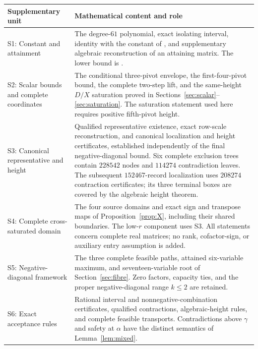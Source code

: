 \documentclass[11pt,reqno]{amsart}
\theoremstyle{definition}
\theoremstyle{remark}
\newcommand{\gam}{\gamma}
\begin{document}
\begingroup
\small
\renewcommand{\arraystretch}{1.08}
\begin{longtable}{@{}>{\raggedright\arraybackslash}p{.21\linewidth}
                        >{\raggedright\arraybackslash}p{.75\linewidth}@{}}
\toprule
Supplementary unit&Mathematical content and role\\
\midrule
\endhead
S1: Constant and attainment&
The degree-\(61\) polynomial, exact isolating interval, identity with
the constant of \cite{ChenEdelmanUrschel2026}, and supplementary
algebraic reconstruction of an attaining matrix. The lower bound is
\cite[Theorem~2.2]{ChenEdelmanUrschel2026}.\\[1mm]

S2: Scalar bounds and complete coordinates&
The conditional three-pivot envelope, the first-four-pivot bound,
the complete two-step lift, and the same-height \(D/X\) saturation
proved in Sections~\ref{sec:scalar}--\ref{sec:saturation}.
The saturation statement used here requires positive fifth-pivot height.\\[1mm]

S3: Canonical representative and height&
Qualified representative existence, exact row-scale reconstruction,
and canonical localization and height certificates, established
independently of the final negative-diagonal bound.
Six complete exclusion trees contain \(228542\) nodes and \(114274\)
contradiction leaves. The subsequent \(152467\)-record localization
uses \(208274\) contraction certificates; its three terminal
boxes are covered by the algebraic height theorem.\\[1mm]

S4: Complete cross-saturated domain&
The four source domains and exact sign and transpose maps of
Proposition~\ref{prop:X}, including their shared boundaries.
The low-\(r\) component uses S3.
All statements concern complete real matrices; no rank, cofactor-sign,
or auxiliary entry assumption is added.\\[1mm]

S5: Negative-diagonal framework&
The three complete feasible paths, attained six-variable maximum,
and seventeen-variable root of Section~\ref{sec:fibre}.
Zero factors, capacity ties, and the proper negative-diagonal
range \(k\le2\) are retained.\\[1mm]

S6: Exact acceptance rules&
Rational interval and nonnegative-combination certificates, qualified
contractions, algebraic-height rules, and complete feasible transports.
Contradictions above \(\gam\) and safety at \(\alpha\) have the
distinct semantics of Lemma~\ref{lem:mixed}.\\[1mm]


\end{longtable}
\end{document}
